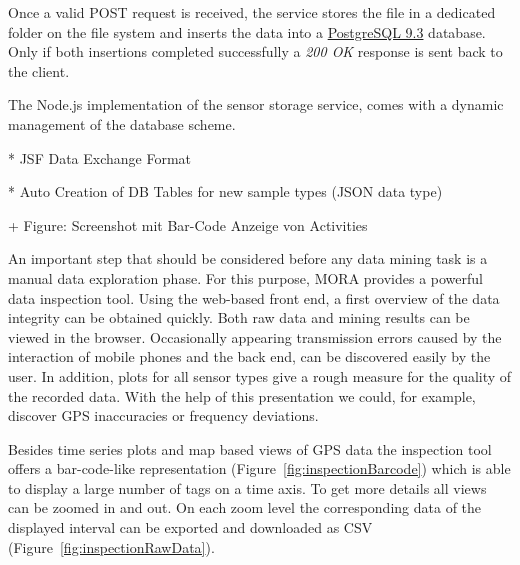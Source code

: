\documentclass[times, 10pt,twocolumn]{article}
\begin{document}
Once a valid POST request is received, the service stores the file in a dedicated folder on the file system and inserts the data into a \href{http://www.postgresql.org/}{PostgreSQL 9.3} database.
Only if both insertions completed successfully a {\em 200 OK} response is sent back to the client.

The Node.js implementation of the sensor storage service, comes with a dynamic management of the database scheme.

* JSF Data Exchange Format

* Auto Creation of DB Tables for new sample types (JSON data type)



+ Figure: Screenshot mit Bar-Code Anzeige von Activities


An important step that should be considered before any data mining task is a manual data exploration phase. For this purpose, MORA provides a powerful data inspection tool. Using the web-based front end, a first overview of the data integrity can be obtained quickly. Both raw data and mining results can be viewed in the browser. Occasionally appearing transmission errors caused by the interaction of mobile phones and the back end, can be discovered easily by the user. In addition, plots for all sensor types give a rough measure for the quality of the recorded data. With the help of this presentation we could, for example, discover GPS inaccuracies or frequency deviations.

Besides time series plots and map based views of GPS data the inspection tool offers a bar-code-like representation (Figure~\ref{fig:inspectionBarcode}) which is able to display a large number of tags on a time axis.
To get more details all views can be zoomed in and out. On each zoom level the corresponding data of the displayed interval can be exported and downloaded as CSV (Figure~\ref{fig:inspectionRawData}).
\end{document}
